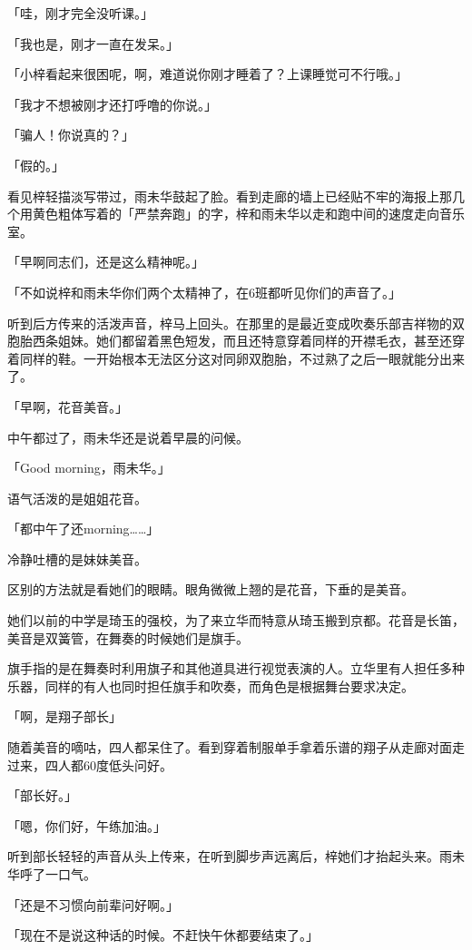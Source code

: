 \documentclass[UTF8]{ctexart}
\begin{document}
    「哇，刚才完全没听课。」

    「我也是，刚才一直在发呆。」

    「小梓看起来很困呢，啊，难道说你刚才睡着了？上课睡觉可不行哦。」

    「我才不想被刚才还打呼噜的你说。」

    「骗人！你说真的？」

    「假的。」

    看见梓轻描淡写带过，雨未华鼓起了脸。看到走廊的墙上已经贴不牢的海报上那几个用黄色粗体写着的「严禁奔跑」的字，梓和雨未华以走和跑中间的速度走向音乐室。

    「早啊同志们，还是这么精神呢。」

    「不如说梓和雨未华你们两个太精神了，在6班都听见你们的声音了。」

    听到后方传来的活泼声音，梓马上回头。在那里的是最近变成吹奏乐部吉祥物的双胞胎西条姐妹。她们都留着黑色短发，而且还特意穿着同样的开襟毛衣，甚至还穿着同样的鞋。一开始根本无法区分这对同卵双胞胎，不过熟了之后一眼就能分出来了。

    「早啊，花音美音。」

    中午都过了，雨未华还是说着早晨的问候。

    「Good morning，雨未华。」

    语气活泼的是姐姐花音。

    「都中午了还morning……」

    冷静吐槽的是妹妹美音。

    区别的方法就是看她们的眼睛。眼角微微上翘的是花音，下垂的是美音。

    她们以前的中学是琦玉的强校，为了来立华而特意从琦玉搬到京都。花音是长笛，美音是双簧管，在舞奏的时候她们是旗手。

    旗手指的是在舞奏时利用旗子和其他道具进行视觉表演的人。立华里有人担任多种乐器，同样的有人也同时担任旗手和吹奏，而角色是根据舞台要求决定。

    「啊，是翔子部长」

    随着美音的嘀咕，四人都呆住了。看到穿着制服单手拿着乐谱的翔子从走廊对面走过来，四人都60度低头问好。

    「部长好。」

    「嗯，你们好，午练加油。」

    听到部长轻轻的声音从头上传来，在听到脚步声远离后，梓她们才抬起头来。雨未华呼了一口气。

    「还是不习惯向前辈问好啊。」

    「现在不是说这种话的时候。不赶快午休都要结束了。」
\end{document}
